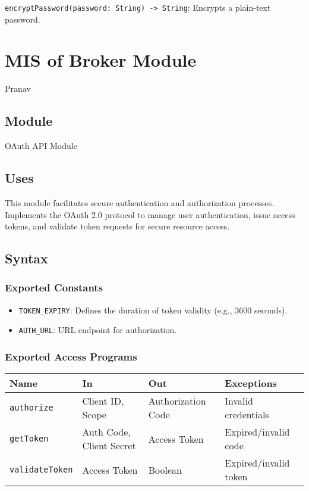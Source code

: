 \documentclass[12pt, titlepage]{article}
\begin{document}
\texttt{encryptPassword(password: String) -> String}: Encrypts a plain-text password.

\newpage


\section{MIS of Broker Module } \label{Module_Broker} Pranav

\subsection{Module}

OAuth API Module

\subsection{Uses}

This module facilitates secure authentication and authorization processes. Implements the OAuth 2.0 protocol to manage user authentication, issue access tokens, and validate token requests for secure resource access.

\subsection{Syntax}

\subsubsection{Exported Constants}
\begin{itemize}
    \item \texttt{TOKEN\_EXPIRY}: Defines the duration of token validity (e.g., 3600 seconds).
    \item \texttt{AUTH\_URL}: URL endpoint for authorization.
\end{itemize}

\subsubsection{Exported Access Programs}

\begin{center}
\begin{tabular}{p{3cm} p{4cm} p{4cm} p{3.5cm}}
\hline
\textbf{Name} & \textbf{In} & \textbf{Out} & \textbf{Exceptions} \\
\hline
\texttt{authorize} & Client ID, Scope & Authorization Code & Invalid credentials \\
\texttt{getToken} & Auth Code, Client Secret & Access Token & Expired/invalid code \\
\texttt{validateToken} & Access Token & Boolean & Expired/invalid token \\
\hline
\end{tabular}
\end{center}
\end{document}
